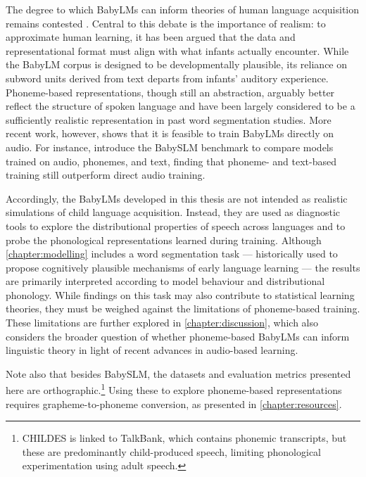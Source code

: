 The degree to which BabyLMs can inform theories of human language acquisition remains contested \citep{dupoux-2018-cognitive,baroni-2022-proper,warstadt-2022-artificial,beinborn2024cognitive,wilcox2025bigger,salhancopil2025}. Central to this debate is the importance of realism: to approximate human learning, it has been argued that the data and representational format must align with what infants actually encounter. While the BabyLM corpus is designed to be developmentally plausible, its reliance on subword units derived from text departs from infants' auditory experience. Phoneme-based representations, though still an abstraction, arguably better reflect the structure of spoken language and have been largely considered to be a sufficiently realistic representation in past word segmentation studies. More recent work, however, shows that it is feasible to train BabyLMs directly on audio. For instance, \citet{lavechin} introduce the BabySLM benchmark to compare models trained on audio, phonemes, and text, finding that phoneme- and text-based training still outperform direct audio training. %


Accordingly, the BabyLMs developed in this thesis are not intended as realistic simulations of child language acquisition. Instead, they are used as diagnostic tools to explore the distributional properties of speech across languages and to probe the phonological representations learned during training. Although \cref{chapter:modelling} includes a word segmentation task --- historically used to propose cognitively plausible mechanisms of early language learning --- the results are primarily interpreted according to model behaviour and distributional phonology. While findings on this task may also contribute to statistical learning theories, they must be weighed against the limitations of phoneme-based training. These limitations are further explored in \cref{chapter:discussion}, which also considers the broader question of whether phoneme-based BabyLMs can inform linguistic theory in light of recent advances in audio-based learning.

Note also that besides BabySLM, the datasets and evaluation metrics presented here are orthographic.\footnote{CHILDES is linked to TalkBank, which contains phonemic transcripts, but these are predominantly child-produced speech, limiting phonological experimentation using adult speech.} Using these to explore phoneme-based representations requires grapheme-to-phoneme conversion, as presented in \cref{chapter:resources}. 

